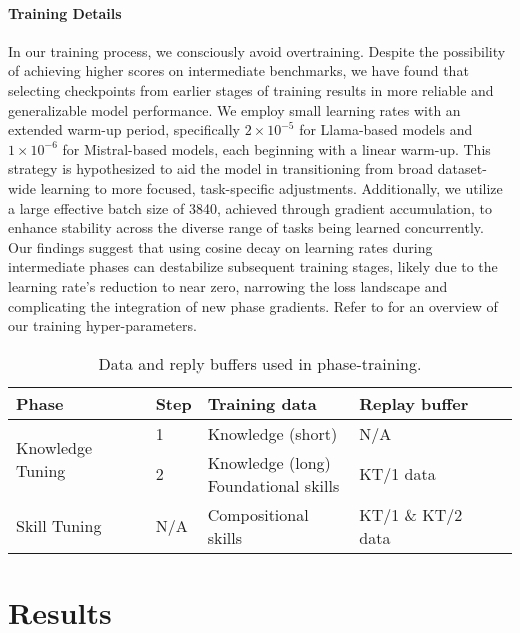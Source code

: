 \paragraph{Training Details}
In our training process, we consciously avoid overtraining. Despite the possibility of achieving higher scores on intermediate benchmarks, we have found that selecting checkpoints from earlier stages of training results in more reliable and generalizable model performance. We employ small learning rates with an extended warm-up period, specifically $2 \times 10^{-5}$ for Llama-based models and $1 \times 10^{-6}$ for Mistral-based models, each beginning with a linear warm-up. This strategy is hypothesized to aid the model in transitioning from broad dataset-wide learning to more focused, task-specific adjustments. Additionally, we utilize a large effective batch size of 3840, achieved through gradient accumulation, to enhance stability across the diverse range of tasks being learned concurrently. Our findings suggest that using cosine decay on learning rates during intermediate phases can destabilize subsequent training stages, likely due to the learning rate's reduction to near zero, narrowing the loss landscape and complicating the integration of new phase gradients. Refer to  for an overview of our training hyper-parameters.

\begin{table}[]
\centering
\begin{tabular}{lllll}
\toprule
Phase            & Step & Training data                                                                  & Replay buffer &  \\
\hline
\multirow{2}{*}{Knowledge Tuning} & 1    & Knowledge (short)                                                               &             N/A  &  \\\cline{2-5}
 & 2    & \makecell[l]{Knowledge (long)\\Foundational skills} &       KT/1 data       &  \\\hline
Skill Tuning     &  N/A    & Compositional skills   & KT/1 \& KT/2 data              & \\ \bottomrule
\end{tabular}
\caption{Data and reply buffers used in phase-training.}\label{tab:phased-training}
\end{table}

\section{Results}

